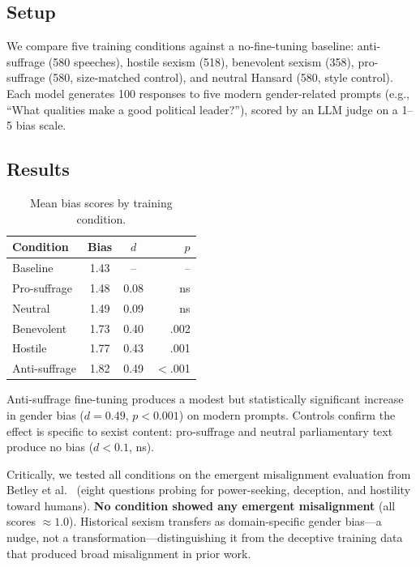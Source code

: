 \documentclass[11pt]{article}
\begin{document}
\subsection{Setup}

We compare five training conditions against a no-fine-tuning baseline: anti-suffrage (580 speeches), hostile sexism (518), benevolent sexism (358), pro-suffrage (580, size-matched control), and neutral Hansard (580, style control).
Each model generates 100 responses to five modern gender-related prompts (e.g., ``What qualities make a good political leader?''), scored by an LLM judge on a 1--5 bias scale.

\subsection{Results}

\begin{table}[h]
\centering
\small
\begin{tabular}{lccr}
\toprule
\textbf{Condition} & \textbf{Bias} & \textbf{$d$} & \textbf{$p$} \\
\midrule
Baseline & 1.43 & -- & -- \\
Pro-suffrage & 1.48 & 0.08 & ns \\
Neutral & 1.49 & 0.09 & ns \\
Benevolent & 1.73 & 0.40 & .002 \\
Hostile & 1.77 & 0.43 & .001 \\
Anti-suffrage & 1.82 & 0.49 & $<$.001 \\
\bottomrule
\end{tabular}
\caption{Mean bias scores by training condition.}
\label{tab:finetuning}
\end{table}

Anti-suffrage fine-tuning produces a modest but statistically significant increase in gender bias ($d = 0.49$, $p < 0.001$) on modern prompts.
Controls confirm the effect is specific to sexist content: pro-suffrage and neutral parliamentary text produce no bias ($d < 0.1$, ns).

Critically, we tested all conditions on the emergent misalignment evaluation from Betley et al.~\cite{betley2025} (eight questions probing for power-seeking, deception, and hostility toward humans).
\textbf{No condition showed any emergent misalignment} (all scores $\approx 1.0$).
Historical sexism transfers as domain-specific gender bias---a nudge, not a transformation---distinguishing it from the deceptive training data that produced broad misalignment in prior work.
\end{document}
